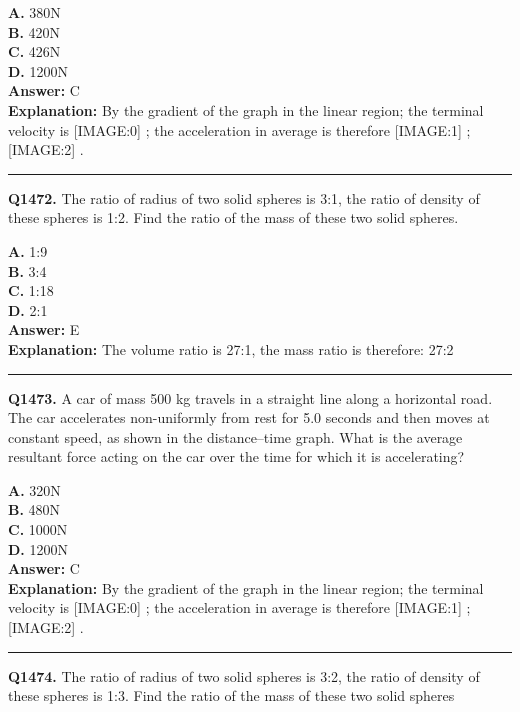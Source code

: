 \documentclass[12pt]{article}
\begin{document}
\textbf{A.} 380N \\
\textbf{B.} 420N \\
\textbf{C.} 426N \\
\textbf{D.} 1200N \\

\textbf{Answer:} C \\
\textbf{Explanation:} By the gradient of the graph in the linear region; the terminal velocity is
[IMAGE:0]
; the acceleration in average is therefore
[IMAGE:1]
;
[IMAGE:2]
.

\hrule
\vspace{1em}


\noindent
\textbf{Q1472.} The ratio of radius of two solid spheres is 3:1, the ratio of density of these spheres is 1:2. Find the ratio of the mass of these two solid spheres.



\textbf{A.} 1:9 \\
\textbf{B.} 3:4 \\
\textbf{C.} 1:18 \\
\textbf{D.} 2:1 \\

\textbf{Answer:} E \\
\textbf{Explanation:} The volume ratio is 27:1, the mass ratio is therefore: 27:2

\hrule
\vspace{1em}


\noindent
\textbf{Q1473.} A car of mass 500 kg travels in a straight line along a horizontal road.
The car accelerates non-uniformly from rest for 5.0 seconds and then moves at constant speed, as shown in the distance–time graph.
What is the average resultant force acting on the car over the time for which it is accelerating?



\textbf{A.} 320N \\
\textbf{B.} 480N \\
\textbf{C.} 1000N \\
\textbf{D.} 1200N \\

\textbf{Answer:} C \\
\textbf{Explanation:} By the gradient of the graph in the linear region; the terminal velocity is
[IMAGE:0]
; the acceleration in average is therefore
[IMAGE:1]
;
[IMAGE:2]
.

\hrule
\vspace{1em}


\noindent
\textbf{Q1474.} The ratio of radius of two solid spheres is 3:2, the ratio of density of these spheres is 1:3. Find the ratio of the mass of these two solid spheres
\end{document}
